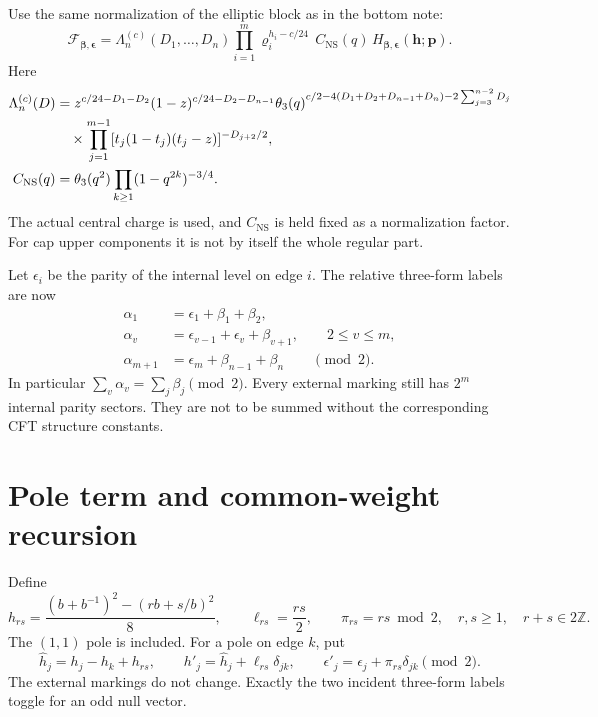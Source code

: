 \documentclass[11pt]{article}
\newcommand{\NS}{\mathrm{NS}}
\newcommand{\eps}{\boldsymbol\epsilon}
\newcommand{\bet}{\boldsymbol\beta}
\newcommand{\hp}{\boldsymbol h}
\newcommand{\pp}{\boldsymbol p}
\begin{document}
Use the same normalization of the elliptic block as in the bottom note:
\begin{equation}\label{eq:reconstruction}
 \boxed{\displaystyle
 \mathcal F_{\bet,\eps}=
 \Lambda_n^{(c)}(D_1,\ldots,D_n)
 \prod_{i=1}^m\varrho_i^{h_i-c/24}\,
 C_{\NS}(q)\,H_{\bet,\eps}(\hp;\pp).}
\end{equation}
Here
\begin{align}
 \Lambda_n^{(c)}(D)
 &=z^{c/24-D_1-D_2}(1-z)^{c/24-D_2-D_{n-1}}
   \theta_3(q)^{c/2-4(D_1+D_2+D_{n-1}+D_n)-2\sum_{j=3}^{n-2}D_j}
   \notag\\
 &\quad\times\prod_{j=1}^{m-1}[t_j(1-t_j)(t_j-z)]^{-D_{j+2}/2},\\
 C_{\NS}(q)&=\theta_3(q^2)\prod_{k\ge1}(1-q^{2k})^{-3/4}.
\end{align}
The actual central charge is used, and $C_{\NS}$ is held fixed as a
normalization factor.  For cap upper components it is not by itself the
whole regular part.

Let $\epsilon_i$ be the parity of the internal level on edge $i$.
The relative three-form labels are now
\begin{align}\label{eq:labels}
 \alpha_1&=\epsilon_1+\beta_1+\beta_2,\\
 \alpha_v&=\epsilon_{v-1}+\epsilon_v+\beta_{v+1},\qquad 2\le v\le m,\\
 \alpha_{m+1}&=\epsilon_m+\beta_{n-1}+\beta_n
 \qquad\pmod 2.
\end{align}
In particular $\sum_v\alpha_v=\sum_j\beta_j\pmod2$.  Every external
marking still has $2^m$ internal parity sectors.  They are not to be
summed without the corresponding CFT structure constants.

\section{Pole term and common-weight recursion}

Define
\begin{equation}
 h_{rs}=\frac{(b+b^{-1})^2-(rb+s/b)^2}{8},\qquad
 \ell_{rs}=\frac{rs}{2},\qquad \pi_{rs}=rs\bmod2,
 \quad r,s\ge1,\quad r+s\in2\mathbb Z.
\end{equation}
The $(1,1)$ pole is included.  For a pole on edge $k$, put
\begin{equation}
 \widehat h_j=h_j-h_k+h_{rs},\qquad
 h'_j=\widehat h_j+\ell_{rs}\delta_{jk},\qquad
 \epsilon'_j=\epsilon_j+\pi_{rs}\delta_{jk}\pmod2.
\end{equation}
The external markings do not change.  Exactly the two incident
three-form labels toggle for an odd null vector.
\end{document}
